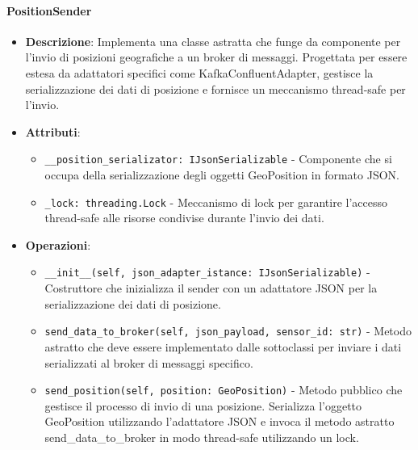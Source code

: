 \documentclass[10pt]{article}
\begin{document}
    \paragraph{PositionSender}
    \begin{itemize} 
    \item \textbf{Descrizione}: Implementa una classe astratta che funge da componente per l'invio di posizioni geografiche a un broker di messaggi. Progettata per essere estesa da adattatori specifici come KafkaConfluentAdapter, gestisce la serializzazione dei dati di posizione e fornisce un meccanismo thread-safe per l'invio.
    \item \textbf{Attributi}:
    \begin{itemize}
        \item \texttt{\_\_position\_serializator: IJsonSerializable} - Componente che si occupa della serializzazione degli oggetti GeoPosition in formato JSON.
        \item \texttt{\_lock: threading.Lock} - Meccanismo di lock per garantire l'accesso thread-safe alle risorse condivise durante l'invio dei dati.
    \end{itemize}
    
    \item \textbf{Operazioni}:
    \begin{itemize}
        \item \texttt{\_\_init\_\_(self, json\_adapter\_istance: IJsonSerializable)} - Costruttore che inizializza il sender con un adattatore JSON per la serializzazione dei dati di posizione.
        
        \item \texttt{send\_data\_to\_broker(self, json\_payload, sensor\_id: str)} - Metodo astratto che deve essere implementato dalle sottoclassi per inviare i dati serializzati al broker di messaggi specifico.
        
        \item \texttt{send\_position(self, position: GeoPosition)} - Metodo pubblico che gestisce il processo di invio di una posizione. Serializza l'oggetto GeoPosition utilizzando l'adattatore JSON e invoca il metodo astratto send\_data\_to\_broker in modo thread-safe utilizzando un lock.
    \end{itemize}
    \end{itemize}
\end{document}
